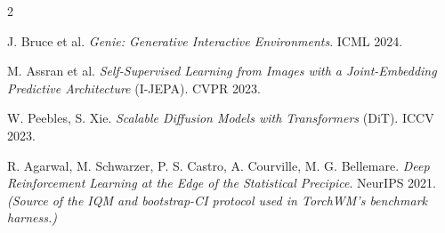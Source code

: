 \documentclass[10pt,a4paper]{article}
\begin{document}
{\begin{multicols}{2}
\begin{enumerate}[leftmargin=5.5mm,itemsep=0.8mm,label={\color{muted}[\arabic*]}]
  \item J. Bruce et al. \emph{Genie: Generative Interactive Environments}. ICML 2024.
  \item M. Assran et al. \emph{Self-Supervised Learning from Images with a Joint-Embedding Predictive Architecture} (I-JEPA). CVPR 2023.
  \item W. Peebles, S. Xie. \emph{Scalable Diffusion Models with Transformers} (DiT). ICCV 2023.
  \item R. Agarwal, M. Schwarzer, P. S. Castro, A. Courville, M. G. Bellemare. \emph{Deep Reinforcement Learning at the Edge of the Statistical Precipice}. NeurIPS 2021. \emph{(Source of the IQM and bootstrap-CI protocol used in TorchWM's benchmark harness.)}
\end{enumerate}
\end{multicols}}
\end{document}
